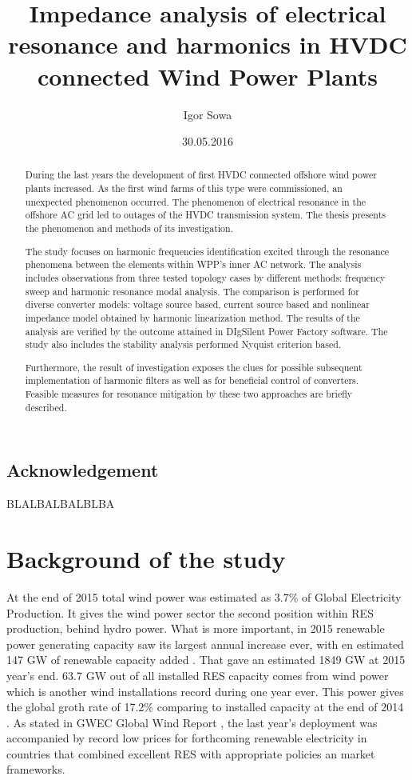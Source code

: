\documentclass[12pt]{report} %
\title{Impedance analysis of electrical resonance and harmonics in HVDC connected Wind Power Plants}
\author{Igor Sowa}
\date{30.05.2016}
\begin{document}
\maketitle
\newpage

\begin{abstract}

During the last years the development of first HVDC connected offshore wind power plants increased. As the first wind farms of this type were commissioned, an unexpected phenomenon occurred. The phenomenon of electrical resonance in the offshore AC grid led to outages of the HVDC transmission system. The thesis presents the phenomenon and methods of its investigation.

The study focuses on harmonic frequencies identification excited through the resonance phenomena between the elements within WPP's inner AC network. The analysis includes observations from three tested topology cases by different methods: frequency sweep and harmonic resonance modal analysis. The comparison is performed for diverse converter models: voltage source based, current source based and nonlinear impedance model obtained by harmonic linearization method. The results of the analysis are verified by the outcome attained in DIgSilent Power Factory software. The study also includes the stability analysis performed Nyquist criterion based.

Furthermore, the result of investigation exposes the clues for possible subsequent implementation of harmonic filters as well as for beneficial control of converters. Feasible measures for resonance mitigation by these two approaches are briefly described.
\end{abstract}
\newpage

\section*{Acknowledgement}
BLALBALBALBLBA
\newpage

\tableofcontents
\newpage
{}

\chapter{Background of the study} \label{sec:motivation}
At the end of 2015 total wind power was estimated as 3.7\% of Global Electricity Production. It gives the wind power sector the second position within RES production, behind hydro power. What is more important, in 2015 renewable power generating capacity saw its largest annual increase ever, with en estimated 147 GW of renewable capacity added \cite{renewables2016}. That gave an estimated 1849 GW at 2015 year's end. 63.7 GW out of all installed RES capacity comes from wind power which is another wind installations record during one year ever. This power gives the global groth rate of 17.2\% comparing to installed capacity at the end of 2014 \cite{wwea2016}. As stated in GWEC Global Wind Report \cite{gwec2015}, the last year's deployment was accompanied by record low prices for forthcoming renewable electricity in countries that combined excellent RES with appropriate policies an market frameworks.
\end{document}
